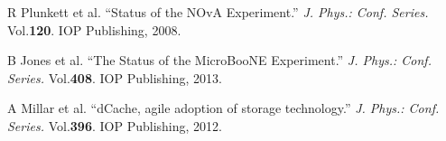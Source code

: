 \documentclass[a4paper]{jpconf}
\begin{document}
\begin{thebibliography}{9}
R Plunkett et al.  ``Status of the NOvA Experiment.''  \textit{J. Phys.: Conf. Series.} Vol.\textbf{120}. IOP Publishing, 2008.



B Jones et al.  ``The Status of the MicroBooNE Experiment.''  \textit{J. Phys.: Conf. Series.} Vol.\textbf{408}. IOP Publishing, 2013.


A Millar et al.  ``dCache, agile adoption of storage technology.''  \textit{J. Phys.: Conf. Series.} Vol.\textbf{396}. IOP Publishing, 2012.


\end{thebibliography}
\end{document}
